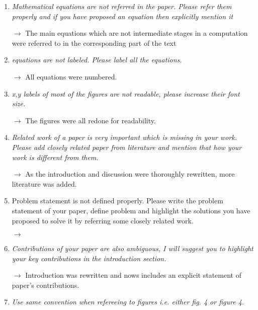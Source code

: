 \documentclass[11pt,a4paper,sans]{moderncv}        %
\begin{document}
\begin{enumerate}
	\item \textit{Mathematical equations are not referred in the paper. Please refer them properly and if you have proposed an equation then explicitly mention it}
	
	$\rightarrow$ The main equations which are not intermediate stages in a computation were referred to in the corresponding part of the text
	
	\medskip
	
	\item \textit{equations are not labeled. Please label all the equations.}
	
	$\rightarrow$ All equations were numbered.
	
	\medskip
	
	\item \textit{x,y labels of most of the figures are not readable, please increase their font size.}
	
	$\rightarrow$ The figures were all redone for readability.
	
	\medskip
	
	\item \textit{Related work of a paper is very important which is missing in your work. Please add closely related paper from literature and mention that how your work is different from them.}

	$\rightarrow$ As the introduction and discussion were thoroughly rewritten, more literature was added.

	\medskip

	\item Problem statement is not defined properly. Please write the problem statement of your paper, define problem and highlight the solutions you have proposed to solve it by referring some closely related work. 
	
	$\rightarrow$ 
	
	\medskip
	
	\item \textit{Contributions of your paper are also ambiguous, I will suggest you to highlight your key contributions in the introduction section.}
	
	$\rightarrow$ Introduction was rewritten and nows includes an explicit statement of paper's contributions.
	
	\medskip

	\item \textit{Use same convention when refereeing to figures i.e. either fig. 4 or figure 4.}
	

\end{enumerate}
\end{document}
